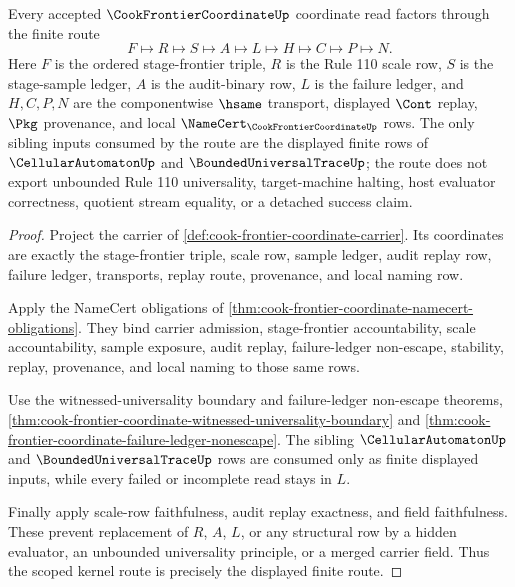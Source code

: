 \begin{theorem}
\label{thm:cook-frontier-coordinate-scoped-kernel-route}
Every accepted $\CookFrontierCoordinateUp$ coordinate read factors through the finite route
$$
F \longmapsto R \longmapsto S \longmapsto A \longmapsto L \longmapsto H \longmapsto C \longmapsto P \longmapsto N.
$$
Here $F$ is the ordered stage-frontier triple, $R$ is the Rule 110 scale row, $S$ is the stage-sample ledger, $A$ is the audit-binary row, $L$ is the failure ledger, and $H,C,P,N$ are the componentwise $\hsame$ transport, displayed $\Cont$ replay, $\Pkg$ provenance, and local $\NameCert_{\CookFrontierCoordinateUp}$ rows. The only sibling inputs consumed by the route are the displayed finite rows of $\CellularAutomatonUp$ and $\BoundedUniversalTraceUp$; the route does not export unbounded Rule 110 universality, target-machine halting, host evaluator correctness, quotient stream equality, or a detached success claim.
\end{theorem}
\begin{proof}
Project the carrier of \autoref{def:cook-frontier-coordinate-carrier}. Its coordinates are exactly the stage-frontier triple, scale row, sample ledger, audit replay row, failure ledger, transports, replay route, provenance, and local naming row.

Apply the NameCert obligations of \autoref{thm:cook-frontier-coordinate-namecert-obligations}. They bind carrier admission, stage-frontier accountability, scale accountability, sample exposure, audit replay, failure-ledger non-escape, stability, replay, provenance, and local naming to those same rows.

Use the witnessed-universality boundary and failure-ledger non-escape theorems, \autoref{thm:cook-frontier-coordinate-witnessed-universality-boundary} and \autoref{thm:cook-frontier-coordinate-failure-ledger-nonescape}. The sibling $\CellularAutomatonUp$ and $\BoundedUniversalTraceUp$ rows are consumed only as finite displayed inputs, while every failed or incomplete read stays in $L$.

Finally apply scale-row faithfulness, audit replay exactness, and field faithfulness. These prevent replacement of $R$, $A$, $L$, or any structural row by a hidden evaluator, an unbounded universality principle, or a merged carrier field. Thus the scoped kernel route is precisely the displayed finite route.
\end{proof}


